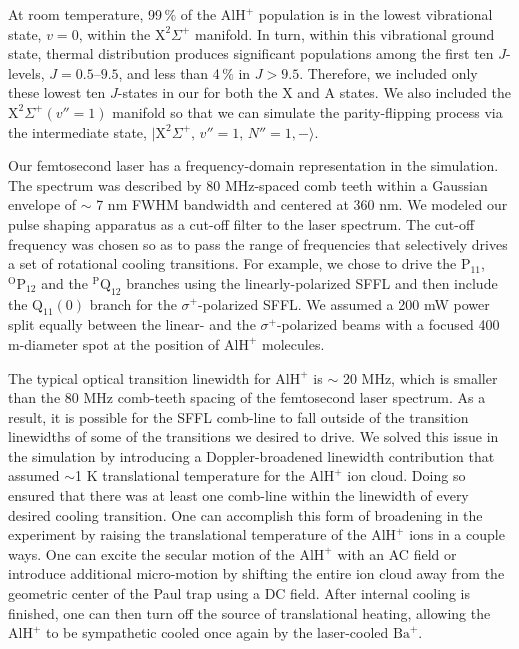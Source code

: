 \documentclass[twoside,twocolumn,9pt]{article}
\begin{document}

At room temperature, 99$\, \%$ of the $\mathrm{AlH}^+$ population is in the lowest vibrational state, $v=0$, within the $\mathrm{X}^2 \Sigma^+$ manifold. In turn, within this vibrational ground state, thermal distribution produces significant populations among the first ten $J$-levels, $J=0.5$--$9.5$, and less than 4$\, \%$ in $J>9.5$. Therefore, we included only these lowest ten $J$-states in our  for both the $\mathrm{X}$ and $\mathrm{A}$ states. We also included the $\mathrm{X}^2\Sigma^+ (v''=1)$ manifold so that we can simulate the parity-flipping process via the intermediate state, $\lvert \mathrm{X}^2\Sigma^+,\, v''=1,\, N''=1, -\rangle$.

Our femtosecond laser has a frequency-domain representation in the simulation. The spectrum was described by 80 MHz-spaced comb teeth within a Gaussian envelope of $\sim$ 7 nm FWHM bandwidth and centered at 360 nm. We modeled our pulse shaping apparatus as a cut-off filter to the laser spectrum. The cut-off frequency was chosen so as to pass the range of frequencies that selectively drives a set of rotational cooling transitions. For example, we chose to drive the $\mathrm{P}_{11}$, $\mathrm{^OP}_{12}$ and the $\mathrm{^PQ}_{12}$ branches using the linearly-polarized SFFL and then include the $\mathrm{Q}_{11}(0)$ branch for the $\sigma^+$-polarized SFFL. We assumed a 200 mW power split equally between the linear- and the $\sigma^+$-polarized beams with a focused 400 \si{\micro}m-diameter spot at the position of $\mathrm{AlH}^+$ molecules.

The typical optical transition linewidth for $\mathrm{AlH}^+$ is $\sim$ 20 MHz, which is smaller than the 80 MHz comb-teeth spacing of the femtosecond laser spectrum. As a result, it is possible for the SFFL comb-line to fall outside of the transition linewidths of some of the transitions we desired to drive. We solved this issue in the simulation by introducing a Doppler-broadened linewidth contribution that assumed $\sim$1 K translational temperature for the $\mathrm{AlH}^+$ ion cloud. Doing so ensured that there was at least one comb-line within the linewidth of every desired cooling transition. One can accomplish this form of broadening in the experiment by raising the translational temperature of the $\mathrm{AlH}^+$ ions in a couple ways. One can excite the secular motion of the $\mathrm{AlH}^+$ with an AC field or introduce additional micro-motion by shifting the entire ion cloud away from the geometric center of the Paul trap using a DC field. After internal cooling is finished, one can then turn off the source of translational heating, allowing the $\mathrm{AlH}^+$ to be sympathetic cooled once again by the laser-cooled $\mathrm{Ba}^+$.
\end{document}
